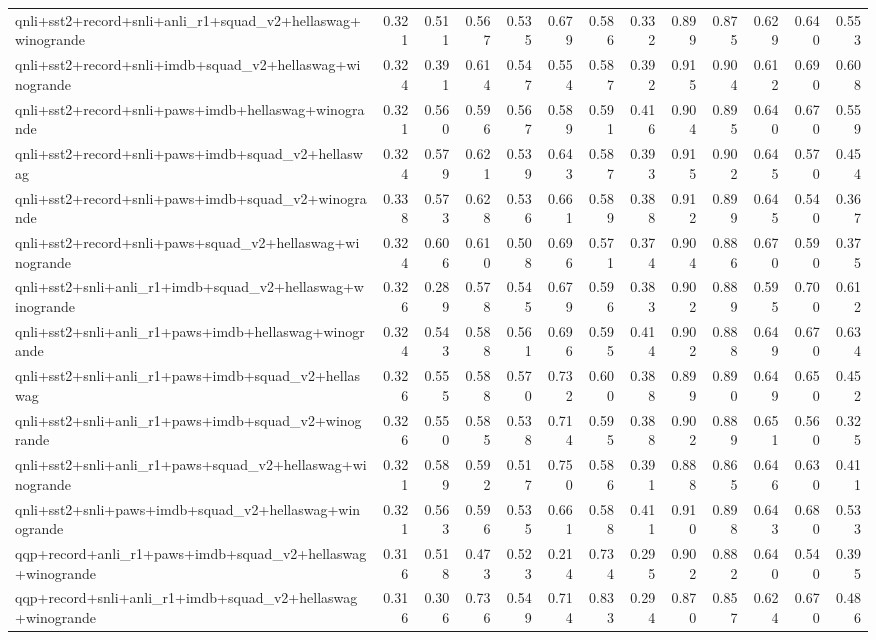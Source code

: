 \begin{table}[t]
\begin{tabular}{lrrrrrrrrrrrr}
    qnli+sst2+record+snli+anli\_r1+squad\_v2+hellaswag+winogrande & 0.321 & 0.511 & 0.567 & 0.535 & 0.679 & 0.586 & 0.332 & 0.899 & 0.875 & 0.629 & 0.640 & 0.553 \\
    qnli+sst2+record+snli+imdb+squad\_v2+hellaswag+winogrande & 0.324 & 0.391 & 0.614 & 0.547 & 0.554 & 0.587 & 0.392 & 0.915 & 0.904 & 0.612 & 0.690 & 0.608 \\
    qnli+sst2+record+snli+paws+imdb+hellaswag+winogrande & 0.321 & 0.560 & 0.596 & 0.567 & 0.589 & 0.591 & 0.416 & 0.904 & 0.895 & 0.640 & 0.670 & 0.559 \\
    qnli+sst2+record+snli+paws+imdb+squad\_v2+hellaswag & 0.324 & 0.579 & 0.621 & 0.539 & 0.643 & 0.587 & 0.393 & 0.915 & 0.902 & 0.645 & 0.570 & 0.454 \\
    qnli+sst2+record+snli+paws+imdb+squad\_v2+winogrande & 0.338 & 0.573 & 0.628 & 0.536 & 0.661 & 0.589 & 0.388 & 0.912 & 0.899 & 0.645 & 0.540 & 0.367 \\
    qnli+sst2+record+snli+paws+squad\_v2+hellaswag+winogrande & 0.324 & 0.606 & 0.610 & 0.508 & 0.696 & 0.571 & 0.374 & 0.904 & 0.886 & 0.670 & 0.590 & 0.375 \\
    qnli+sst2+snli+anli\_r1+imdb+squad\_v2+hellaswag+winogrande & 0.326 & 0.289 & 0.578 & 0.545 & 0.679 & 0.596 & 0.383 & 0.902 & 0.889 & 0.595 & 0.700 & 0.612 \\
    qnli+sst2+snli+anli\_r1+paws+imdb+hellaswag+winogrande & 0.324 & 0.543 & 0.588 & 0.561 & 0.696 & 0.595 & 0.414 & 0.902 & 0.888 & 0.649 & 0.670 & 0.634 \\
    qnli+sst2+snli+anli\_r1+paws+imdb+squad\_v2+hellaswag & 0.326 & 0.555 & 0.588 & 0.570 & 0.732 & 0.600 & 0.388 & 0.899 & 0.890 & 0.649 & 0.650 & 0.452 \\
    qnli+sst2+snli+anli\_r1+paws+imdb+squad\_v2+winogrande & 0.326 & 0.550 & 0.585 & 0.538 & 0.714 & 0.595 & 0.388 & 0.902 & 0.889 & 0.651 & 0.560 & 0.325 \\
    qnli+sst2+snli+anli\_r1+paws+squad\_v2+hellaswag+winogrande & 0.321 & 0.589 & 0.592 & 0.517 & 0.750 & 0.586 & 0.391 & 0.888 & 0.865 & 0.646 & 0.630 & 0.411 \\
    qnli+sst2+snli+paws+imdb+squad\_v2+hellaswag+winogrande & 0.321 & 0.563 & 0.596 & 0.535 & 0.661 & 0.588 & 0.411 & 0.910 & 0.898 & 0.643 & 0.680 & 0.533 \\
    qqp+record+anli\_r1+paws+imdb+squad\_v2+hellaswag+winogrande & 0.316 & 0.518 & 0.473 & 0.523 & 0.214 & 0.734 & 0.295 & 0.902 & 0.882 & 0.640 & 0.540 & 0.395 \\
    qqp+record+snli+anli\_r1+imdb+squad\_v2+hellaswag+winogrande & 0.316 & 0.306 & 0.736 & 0.549 & 0.714 & 0.833 & 0.294 & 0.870 & 0.857 & 0.624 & 0.670 & 0.486 \\

\end{tabular}
\end{table}
